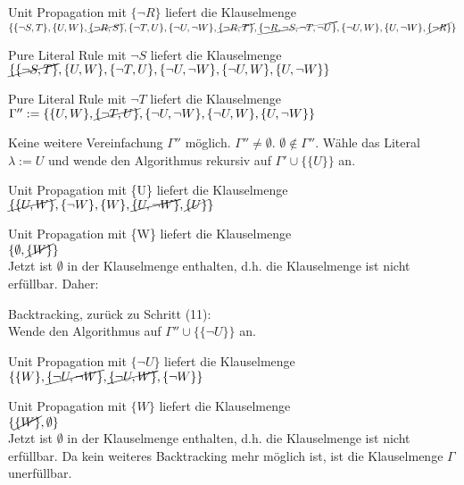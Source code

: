 \documentclass[a4paper,10pt]{article}
\begin{document}
\begin{compactenum} [(1)]
		\item Unit Propagation mit $\{\lnot R\}$ liefert die Klauselmenge \\
		$ \{\{\lnot S,T\},\{U,W\},\cancel{\{\lnot R,S\}},\{\lnot T,U\},\{\lnot U,\lnot W\}, \cancel{\{\lnot R,T\}},\cancel{\{\lnot R,\lnot S,\lnot T,\lnot U\}},\{\lnot U,W\},\{U,\lnot W\},\cancel{\{\lnot R \}}\} $\\
		
		\item Pure Literal Rule mit $ \lnot S $ liefert die Klauselmenge \\
		$ \cancel{\{\{\lnot S,T\}},\{U,W\},\{\lnot T,U\},\{\lnot U,\lnot W\}, \{\lnot U,W\},\{U,\lnot W\}\} $\\
		
		\item Pure Literal Rule mit $ \lnot T $ liefert die Klauselmenge \\
		$ \Gamma'' := \{\{U,W\},\cancel{\{\lnot T,U\}},\{\lnot U,\lnot W\}, \{\lnot U,W\},\{U,\lnot W\}\} $\\
		
		\item Keine weitere Vereinfachung $ \Gamma'' $ möglich. $ \Gamma'' \neq \emptyset $. $ \emptyset \not\in \Gamma''.$ Wähle das Literal $ \lambda := U $ und wende den Algorithmus rekursiv auf $ \Gamma' \cup \{\{U\}\} $ an.\\
		
		\item Unit Propagation mit \{U\} liefert die Klauselmenge \\
		$ \cancel{\{\{U,W\}},\{\lnot W\}, \{W\},\cancel{\{U,\lnot W\}},\cancel{\{U\}}\} $\\
		
		\item Unit Propagation mit \{W\} liefert die Klauselmenge \\
		$ \{ \emptyset, \cancel{\{W\}}\} $ \\
		Jetzt ist $ \emptyset $ in der Klauselmenge enthalten, d.h. die Klauselmenge ist nicht erfüllbar. Daher: \\
		
		\item Backtracking, zurück zu Schritt (11): \\
		Wende den Algorithmus auf $ \Gamma'' \cup \{\{\lnot U\}\} $ an.\\
		
		\item Unit Propagation mit $\{\lnot U\}$ liefert die Klauselmenge \\
		$ \{\{W\},\cancel{\{\lnot U,\lnot W\}}, \cancel{\{\lnot U,W\}},\{\lnot W\}\} $\\
		
		\item Unit Propagation mit $\{W\}$ liefert die Klauselmenge \\
		$ \{\cancel{\{W\}},\emptyset\} $ \\
		Jetzt ist $ \emptyset $ in der Klauselmenge enthalten, d.h. die Klauselmenge ist nicht erfüllbar. Da kein weiteres Backtracking mehr möglich ist, ist die Klauselmenge $ \Gamma $ unerfüllbar.
	\end{compactenum}
\end{document}
